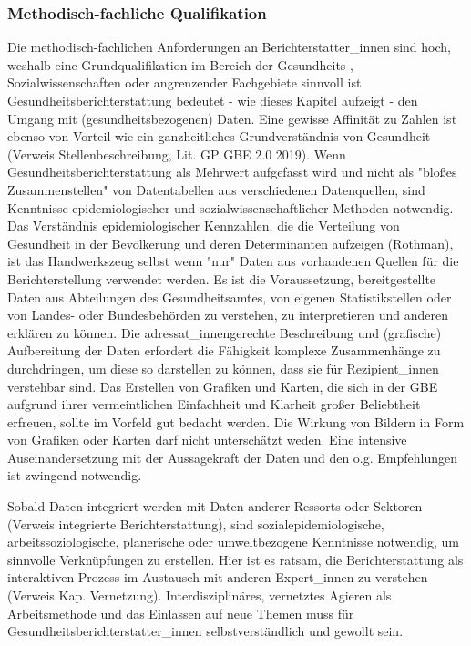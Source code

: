 \documentclass{article}
\begin{document}
\subsubsection{Methodisch-fachliche Qualifikation}\label{H1887934}



Die methodisch-fachlichen Anforderungen an Berichterstatter\_innen sind hoch, weshalb eine Grundqualifikation im Bereich der Gesundheits-, Sozialwissenschaften oder angrenzender Fachgebiete sinnvoll ist. Gesundheitsberichterstattung bedeutet - wie dieses Kapitel aufzeigt - den Umgang mit (gesundheitsbezogenen) Daten. Eine gewisse Affinität zu Zahlen ist ebenso von Vorteil wie ein ganzheitliches Grundverständnis von Gesundheit (Verweis Stellenbeschreibung, Lit. GP GBE 2.0 2019).  Wenn Gesundheitsberichterstattung als Mehrwert aufgefasst wird und nicht als "bloßes Zusammenstellen" von Datentabellen aus verschiedenen Datenquellen, sind Kenntnisse epidemiologischer und sozialwissenschaftlicher Methoden notwendig. Das Verständnis epidemiologischer Kennzahlen, die die Verteilung von Gesundheit in der Bevölkerung und deren Determinanten aufzeigen (Rothman), ist das Handwerkszeug selbst wenn "nur" Daten aus vorhandenen Quellen für die Berichterstellung verwendet werden. Es ist die Voraussetzung, bereitgestellte Daten aus Abteilungen des Gesundheitsamtes, von eigenen Statistikstellen oder von Landes- oder Bundesbehörden zu verstehen, zu interpretieren und anderen erklären zu können. Die adressat\_innengerechte Beschreibung und (grafische) Aufbereitung der Daten erfordert die Fähigkeit komplexe Zusammenhänge zu durchdringen, um diese so darstellen zu können, dass sie für Rezipient\_innen verstehbar sind. Das Erstellen von Grafiken und Karten, die sich in der GBE aufgrund ihrer vermeintlichen Einfachheit und Klarheit großer Beliebtheit erfreuen, sollte im Vorfeld gut bedacht werden. Die Wirkung von Bildern in Form von Grafiken oder Karten darf nicht unterschätzt weden. Eine  intensive Auseinandersetzung mit der Aussagekraft der Daten und den o.g. Empfehlungen ist zwingend notwendig.


Sobald  Daten integriert werden mit Daten anderer Ressorts oder Sektoren (Verweis integrierte Berichterstattung), sind sozialepidemiologische, arbeitssoziologische, planerische oder umweltbezogene Kenntnisse notwendig, um sinnvolle Verknüpfungen zu erstellen. Hier ist es ratsam, die Berichterstattung als interaktiven Prozess im Austausch mit anderen Expert\_innen zu verstehen (Verweis Kap. Vernetzung). Interdisziplinäres, vernetztes Agieren als Arbeitsmethode und das Einlassen auf neue Themen muss für Gesundheitsberichterstatter\_innen selbstverständlich und gewollt sein.
\end{document}
